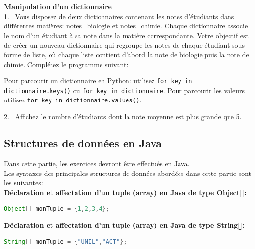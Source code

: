     \begin{Exercice}[5 minutes] [Python] \textbf{Manipulation d'un dictionnaire}\\
      	
        1. \ Vous disposez de deux dictionnaires contenant les notes d'étudiants dans différentes matières: notes\_biologie et notes\_chimie. Chaque dictionnaire associe le nom d'un étudiant à sa note dans la matière correspondante. Votre objectif est de créer un nouveau dictionnaire qui regroupe les notes de chaque étudiant sous forme de liste, où chaque liste contient d'abord la note de biologie puis la note de chimie. Complétez le programme suivant: \\

        \begin{conseil}
            Pour parcourir un dictionnaire en Python: utilisez \texttt{for key in dictionnaire.keys()} ou \texttt{for key in dictionnaire}. Pour parcourir les valeurs utilisez \texttt{for key in dictionnaire.values()}.
        \end{conseil}
       
        
      	2. \ Affichez le nombre d'étudiants dont la note moyenne est plus grande que 5.

        \begin{solution}
            
        \end{solution}
    \end{Exercice}
    
    \subsection{Structures de données en Java}
    Dans cette partie, les exercices devront être effectués en Java. \\
    Les syntaxes des principales structures de données abordées dans cette partie sont les suivantes: \\
    \textbf{Déclaration et affectation d'un tuple (array) en Java de type Object[]:}
     \begin{lstlisting}[language=Java]
Object[] monTuple = {1,2,3,4}; \end{lstlisting} 
\textbf{Déclaration et affectation d'un tuple (array) en Java de type String[]:}
     \begin{lstlisting}[language=Java]
String[] monTuple = {"UNIL","ACT"}; \end{lstlisting} 

